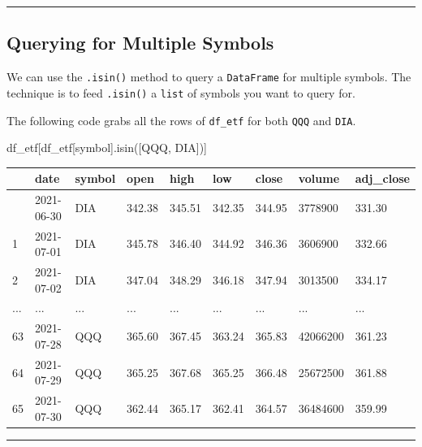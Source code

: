 \documentclass[
  letterpaper,
  DIV=11,
  numbers=noendperiod]{scrreprt}
\newenvironment{Shaded}{\begin{snugshade}}{\end{snugshade}}
\newcommand{\NormalTok}[1]{\textcolor[rgb]{0.00,0.23,0.31}{#1}}
\newcommand{\StringTok}[1]{\textcolor[rgb]{0.13,0.47,0.30}{#1}}
\begin{document}
\begin{center}\rule{0.5\linewidth}{0.5pt}\end{center}

\hypertarget{querying-for-multiple-symbols}{%
\subsection{Querying for Multiple
Symbols}\label{querying-for-multiple-symbols}}

We can use the \texttt{.isin()} method to query a \texttt{DataFrame} for
multiple symbols. The technique is to feed \texttt{.isin()} a
\texttt{list} of symbols you want to query for.

The following code grabs all the rows of \texttt{df\_etf} for both
\texttt{QQQ} and \texttt{DIA}.

\begin{Shaded}
\begin{Highlighting}[]
\NormalTok{df\_etf[df\_etf[}\StringTok{\textquotesingle{}symbol\textquotesingle{}}\NormalTok{].isin([}\StringTok{\textquotesingle{}QQQ\textquotesingle{}}\NormalTok{, }\StringTok{\textquotesingle{}DIA\textquotesingle{}}\NormalTok{])]}
\end{Highlighting}
\end{Shaded}

\begin{longtable}[]{@{}lllllllll@{}}
\toprule\noalign{}
& date & symbol & open & high & low & close & volume & adj\_close \\
\midrule\noalign{}
\endhead
\bottomrule\noalign{}
\endlastfoot
0 & 2021-06-30 & DIA & 342.38 & 345.51 & 342.35 & 344.95 & 3778900 &
331.30 \\
1 & 2021-07-01 & DIA & 345.78 & 346.40 & 344.92 & 346.36 & 3606900 &
332.66 \\
2 & 2021-07-02 & DIA & 347.04 & 348.29 & 346.18 & 347.94 & 3013500 &
334.17 \\
... & ... & ... & ... & ... & ... & ... & ... & ... \\
63 & 2021-07-28 & QQQ & 365.60 & 367.45 & 363.24 & 365.83 & 42066200 &
361.23 \\
64 & 2021-07-29 & QQQ & 365.25 & 367.68 & 365.25 & 366.48 & 25672500 &
361.88 \\
65 & 2021-07-30 & QQQ & 362.44 & 365.17 & 362.41 & 364.57 & 36484600 &
359.99 \\
\end{longtable}

\begin{center}\rule{0.5\linewidth}{0.5pt}\end{center}
\end{document}
